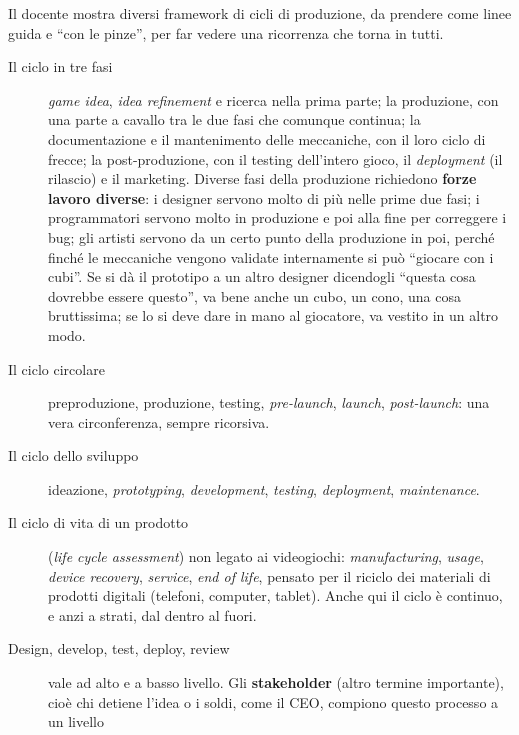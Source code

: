 

Il docente mostra diversi framework di cicli di produzione, da prendere come
linee guida e ``con le pinze'', per far vedere una ricorrenza che torna in
tutti.

\begin{description}
  \item[Il ciclo in tre fasi] \emph{game idea}, \emph{idea refinement} e
        ricerca nella prima parte; la produzione, con una parte a cavallo tra
        le due fasi che comunque continua; la documentazione e il mantenimento
        delle meccaniche, con il loro ciclo di frecce; la post-produzione, con
        il testing dell'intero gioco, il \emph{deployment} (il rilascio) e il
        marketing. Diverse fasi della produzione richiedono \textbf{forze
        lavoro diverse}: i designer servono molto di più nelle prime due fasi;
        i programmatori servono molto in produzione e poi alla fine per
        correggere i bug; gli artisti servono da un certo punto della
        produzione in poi, perché finché le meccaniche vengono validate
        internamente si può ``giocare con i cubi''. Se si dà il prototipo a un
        altro designer dicendogli ``questa cosa dovrebbe essere questo'', va
        bene anche un cubo, un cono, una cosa bruttissima; se lo si deve dare
        in mano al giocatore, va vestito in un altro modo.
  \item[Il ciclo circolare] preproduzione, produzione, testing,
        \emph{pre-launch}, \emph{launch}, \emph{post-launch}: una vera
        circonferenza, sempre ricorsiva.
  \item[Il ciclo dello sviluppo] ideazione, \emph{prototyping},
        \emph{development}, \emph{testing}, \emph{deployment},
        \emph{maintenance}.
  \item[Il ciclo di vita di un prodotto] (\emph{life cycle assessment}) non
        legato ai videogiochi: \emph{manufacturing}, \emph{usage},
        \emph{device recovery}, \emph{service}, \emph{end of life}, pensato
        per il riciclo dei materiali di prodotti digitali (telefoni, computer,
        tablet). Anche qui il ciclo è continuo, e anzi a strati, dal dentro
        al fuori.
  \item[Design, develop, test, deploy, review] vale ad alto e a basso livello.
        Gli \textbf{stakeholder} (altro termine importante), cioè chi detiene
        l'idea o i soldi, come il CEO, compiono questo processo a un livello

\end{description}

